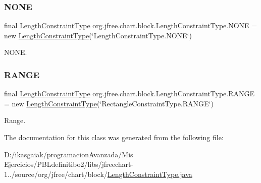 \subsubsection{\texorpdfstring{N\+O\+NE}{NONE}}
{\footnotesize\ttfamily final \mbox{\hyperlink{classorg_1_1jfree_1_1chart_1_1block_1_1_length_constraint_type}{Length\+Constraint\+Type}} org.\+jfree.\+chart.\+block.\+Length\+Constraint\+Type.\+N\+O\+NE = new \mbox{\hyperlink{classorg_1_1jfree_1_1chart_1_1block_1_1_length_constraint_type}{Length\+Constraint\+Type}}(\char`\"{}Length\+Constraint\+Type.\+N\+O\+NE\char`\"{})\hspace{0.3cm}{\ttfamily [static]}}

N\+O\+NE. \mbox{\label{classorg_1_1jfree_1_1chart_1_1block_1_1_length_constraint_type_ab109faf0c5a8c1e9279969ef417ecffd}} 
\subsubsection{\texorpdfstring{R\+A\+N\+GE}{RANGE}}
{\footnotesize\ttfamily final \mbox{\hyperlink{classorg_1_1jfree_1_1chart_1_1block_1_1_length_constraint_type}{Length\+Constraint\+Type}} org.\+jfree.\+chart.\+block.\+Length\+Constraint\+Type.\+R\+A\+N\+GE = new \mbox{\hyperlink{classorg_1_1jfree_1_1chart_1_1block_1_1_length_constraint_type}{Length\+Constraint\+Type}}(\char`\"{}Rectangle\+Constraint\+Type.\+R\+A\+N\+GE\char`\"{})\hspace{0.3cm}{\ttfamily [static]}}

Range. 

The documentation for this class was generated from the following file\+:\begin{DoxyCompactItemize}
\item 
D\+:/ikasgaiak/programacion\+Avanzada/\+Mis Ejercicios/\+P\+B\+Ldefinitibo2/libs/jfreechart-\/1../source/org/jfree/chart/block/\mbox{\hyperlink{_length_constraint_type_8java}{Length\+Constraint\+Type.\+java}}\end{DoxyCompactItemize}
